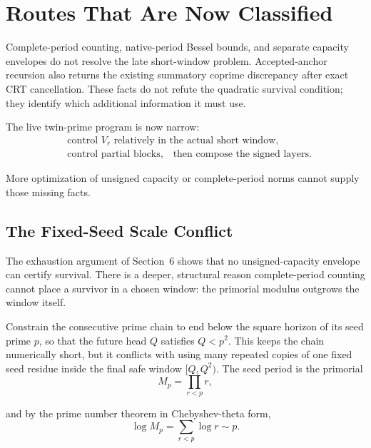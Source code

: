 \section{Routes That Are Now Classified}
\label{sec:routes-classified}

Complete-period counting, native-period Bessel bounds, and separate capacity
envelopes do not resolve the late short-window problem. Accepted-anchor
recursion also returns the existing summatory coprime discrepancy after exact
CRT cancellation. These facts do not refute the quadratic survival condition;
they identify which additional information it must use.

The live twin-prime program is now narrow:
\begin{equation*}
\begin{aligned}
& \text{control }V_r\text{ relatively in the actual short window,}\\
& \text{control partial blocks,}
\quad
\text{then compose the signed layers.}
\end{aligned}
\end{equation*}

More optimization of unsigned capacity or complete-period norms cannot supply
those missing facts.

\subsection{The Fixed-Seed Scale Conflict}
\label{sec:fixed-seed-scale-conflict}

The exhaustion argument of Section~6 shows that no unsigned-capacity envelope can
certify survival. There is a deeper, structural reason complete-period
counting cannot place a survivor in a chosen window: the primorial modulus
outgrows the window itself.

Constrain the consecutive prime chain to end below the square horizon of its
seed prime $p$, so that the future head $Q$ satisfies $Q<p^2$. This keeps
the chain numerically short, but it conflicts with using many repeated
copies of one fixed seed residue inside the final safe window $[Q,Q^2)$.
The seed period is the primorial
\begin{equation*}
M_p=\prod_{r<p}r,
\end{equation*}

and by the prime number theorem in Chebyshev-theta form,
\begin{equation*}
\log M_p=\sum_{r<p}\log r\sim p.
\end{equation*}

